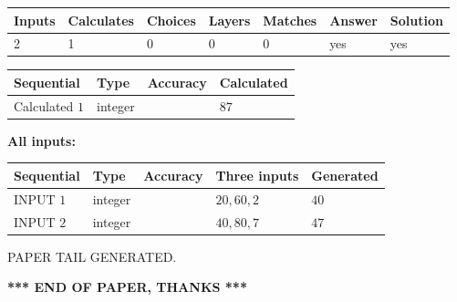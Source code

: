 \documentclass[12pt]{article}
\begin{document}
   
   
   
\noindent\begin{tabular}{|l|l|l|l|l|l|l|}
 \hline
Inputs & Calculates & Choices & Layers & Matches & Answer & Solution \\ \hline
 2  & 
 1  & 
 0
  & 
 0  & 
 0  & 
  yes & 
  yes 
  \\ \hline
 \end{tabular}
   
   
   
   
\noindent{}
   
   
  
  
\noindent\begin{tabular}{|l|l|l|l|}
\hline
 Sequential & Type & Accuracy & Calculated \\ 
\hline
 
 
  Calculated $  1 $ & integer &  & 
  $ 87 $ 
 \\  \hline  
 \end{tabular}
   
   
   
   
\noindent\vspace{0.1in}\hspace{-0.08in} {\textbf{\Large{All inputs: }}}
   
   
  
  
\noindent\begin{tabular}{|l|l|l|l|l|}
\hline
 Sequential & Type & Accuracy & Three inputs & Generated \\ 
\hline
 
 
  INPUT $  1 $ & integer &  & $
 20
 , 
 60
 , 
 2
 $ & $ 40 $ 
 \\  \hline  
 
 
  INPUT $  2 $ & integer &  & $
 40
 , 
 80
 , 
 7
 $ & $ 47 $ 
 \\  \hline  
 \end{tabular}
   
   
   
   
   
   
 \vspace{0.2in}
 
   
   
\vspace{2.0in} PAPER TAIL GENERATED.
   
   
   
   
\vspace{1.0in} 
{\textbf{\large{ *** END OF PAPER, THANKS *** }}} 
   
\end{document}
